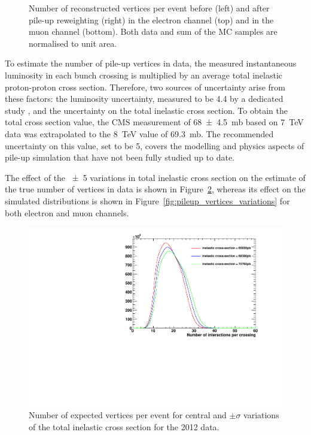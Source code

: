 \begin{figure}[!htpb]
\begin{center}
	\caption{\label{fig:pileup_vertices}
    Number of reconstructed vertices per event before (left) and after pile-up reweighting (right) in the electron
    channel (top) and in the muon channel (bottom). Both data and sum of the MC samples are normalised to unit area.}
\end{center}
\end{figure}

To estimate the number of pile-up vertices in data, the measured instantaneous luminosity in each bunch crossing is
multiplied by an average total inelastic proton-proton cross section. Therefore, two sources of uncertainty arise from
these factors: the luminosity uncertainty, measured to be \SI{4.4}{\pc} by a dedicated study \autocite{CMS_lumi_2012},
and the uncertainty on the total inelastic cross section. To obtain the total cross section value, the CMS measurement
of \SI{68\pm4.5}{\milli\barn} based on \SI{7}{\TeV} data \autocite{CMS_total_inelastic_7TeV} was extrapolated to the
\SI{8}{\TeV} value of \SI{69.3}{\milli\barn}. The recommended uncertainty on this value, set to be \SI{5}{\pc}, covers
the modelling and physics aspects of pile-up simulation that have not been fully studied up to date.


The effect of the \SI{\pm5}{\pc} variations in total inelastic cross section on the estimate of the true number of
vertices in data is shown in Figure~\ref{fig:pileup_truth}, whereas its effect on the simulated distributions is shown
in Figure~\ref{fig:pileup_vertices_variations} for both electron and muon channels.

 \begin{figure}[hbtp]
   \centering
     \includegraphics[width=\textwidth]{vertices/PileUp_2012_truth_data.pdf}
     \caption{Number of expected vertices per event for central and $\pm \sigma$ variations of the total inelastic cross
     section for the 2012 data.}
     \label{fig:pileup_truth}
 \end{figure}

